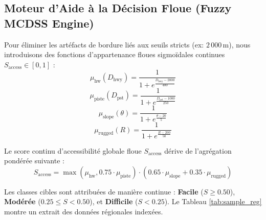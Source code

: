\documentclass[11pt,twocolumn,a4paper]{article}
\begin{document}
\subsection{Moteur d'Aide à la Décision Floue (Fuzzy MCDSS Engine)}
Pour éliminer les artéfacts de bordure liés aux seuils stricts (ex: $2\,000\,\text{m}$), nous introduisons des fonctions d'appartenance floues sigmoïdales continues $S_{\text{access}} \in [0, 1]$ :
\begin{equation}
\mu_{\text{hw}}(D_{\text{hwy}}) = \frac{1}{1 + e^{\frac{D_{\text{hwy}} - 2000}{400}}}
\end{equation}
\begin{equation}
\mu_{\text{piste}}(D_{\text{pst}}) = \frac{1}{1 + e^{\frac{D_{\text{pst}} - 1000}{250}}}
\end{equation}
\begin{equation}
\mu_{\text{slope}}(\theta) = \frac{1}{1 + e^{\frac{\theta - 20}{5}}}
\end{equation}
\begin{equation}
\mu_{\text{rugged}}(R) = \frac{1}{1 + e^{\frac{R - 200}{50}}}
\end{equation}

Le score continu d'accessibilité globale floue $S_{\text{access}}$ dérive de l'agrégation pondérée suivante :
\begin{equation}
S_{\text{access}} = \max\left(\mu_{\text{hw}}, 0.75 \cdot \mu_{\text{piste}}\right) \cdot \left(0.65 \cdot \mu_{\text{slope}} + 0.35 \cdot \mu_{\text{rugged}}\right)
\end{equation}

Les classes cibles sont attribuées de manière continue : \textbf{Facile} ($S \ge 0.50$), \textbf{Modérée} ($0.25 \le S < 0.50$), et \textbf{Difficile} ($S < 0.25$). Le Tableau \ref{tab:sample_reg} montre un extrait des données régionales indexées.
\end{document}
